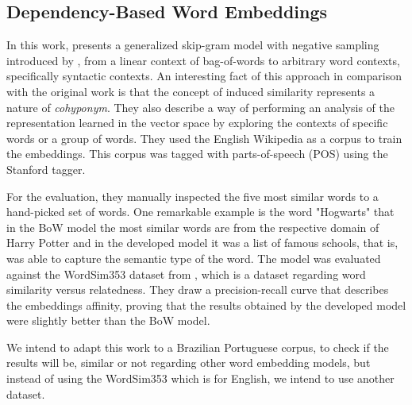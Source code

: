 \subsection{Dependency-Based Word Embeddings}

In this work,  presents a generalized skip-gram model with negative sampling introduced by , from a linear context of bag-of-words to arbitrary word contexts, specifically syntactic contexts. An interesting fact of this approach in comparison with the original work is that the concept of induced similarity represents a nature of \textit{cohyponym}. They also describe a way of performing an analysis of the representation learned in the vector space by exploring the contexts of specific words or a group of words.
They used the English Wikipedia as a corpus to train the embeddings. This corpus was tagged with parts-of-speech (POS) using the Stanford tagger. 

For the evaluation, they manually inspected the five most similar words to a hand-picked set of words. One remarkable example is the word "Hogwarts" that in the BoW model the most similar words are from the respective domain of Harry Potter and in the developed model it was a list of famous schools, that is, was able to capture the semantic type of the word.
The model was evaluated against the WordSim353 dataset from , which is a dataset regarding word similarity versus relatedness. They draw a precision-recall curve that describes the embeddings affinity, proving that the results obtained by the developed model were slightly better than the BoW model.

We intend to adapt this work to a Brazilian Portuguese corpus, to check if the results will be, similar or not regarding other word embedding models, but instead of using the WordSim353 which is for English, we intend to use another dataset.
